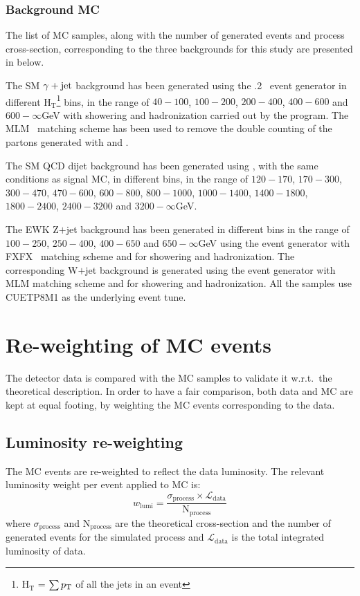 \subsubsection{Background MC}
The list of MC samples, along with the number of generated events and process cross-section,
corresponding to the three backgrounds for this study are presented in \tab{\ref{Table:BkgSamples}} below.

\vspace{-0.3in}

The SM $\gamma+\mathrm{jet}$ background has been generated using the .2~\cite{Alwall:2014hca} event generator in different H$_{\textrm{T}}$\footnote{H$_{\textrm{T}}$ =
  $\sum{\ensuremath{p_{\mathrm T}}}$ of all the jets in an event} bins, in the range of $40-100$, $100-200$, $200-400$, $400-600$ and $600-\infty$\unit{GeV} with showering and hadronization
carried out by the \pythia program. The MLM~\cite{Alwall:2007fs} matching scheme has been used to remove the double counting of the partons generated with
\madgraph and \pythia.    

The SM QCD dijet background has been generated using \pythia, with the same conditions as signal MC, in different \pt bins, in the range of
$120-170$, $170-300$, $300-470$, $470-600$, $600-800$, $800-1000$, $1000-1400$, $1400-1800$,
$1800-2400$, $2400-3200$ and $3200-\infty$\unit{GeV}.

The EWK Z$+$jet background has been generated in different \pt bins in the range of $100-250$, $250-400$, $400-650$ and $650-\infty$\unit{GeV}
using the \amcatnlo event generator with FXFX~\cite{Alwall:2007fs} matching scheme
and \pythia for showering and hadronization. The corresponding W$+$jet background is generated using the \madgraph event generator
with MLM matching scheme and \pythia for showering and hadronization. All the samples use CUETP8M1 as the underlying event tune.

\section{Re-weighting of MC events}
The detector data is compared with the MC samples to validate it w.r.t.\ the theoretical description. In order to have a fair comparison, both data and MC
are kept at equal footing, by weighting the MC events corresponding to the data.
\subsection{Luminosity re-weighting}
The MC events are re-weighted to reflect the data luminosity. The relevant luminosity weight per event applied to MC is:
\begin{equation}
w_{\textrm{lumi}} = \frac{\sigma_{\textrm{process}} \times \mathcal{L}_{\textrm{data}}}{\textrm{N}_{\textrm{process}}}
\end{equation}
where $\sigma_{\textrm{process}}$ and $\textrm{N}_{\textrm{process}}$ are the theoretical cross-section and the number of generated events for the simulated
process and $\mathcal{L}_{\textrm{data}}$ is the total integrated luminosity of data.

